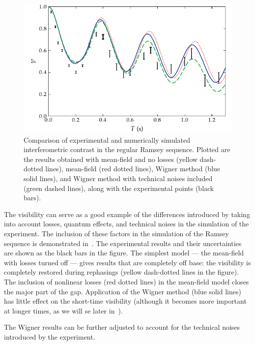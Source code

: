 \begin{figure}
    \centerline{\includegraphics{figures_generated/bec_noise/ramsey_visibility_short.pdf}}

    \caption{
    Comparison of experimental and numerically simulated interferometric contrast in the regular Ramsey sequence.
    Plotted are the results obtained with mean-field and no losses (yellow dash-dotted lines), mean-field (red dotted lines), Wigner method (blue solid lines), and Wigner method with technical noises included (green dashed lines), along with the experimental points (black bars).}

    \label{fig:bec-noise:visibility:ramsey-visibility}
\end{figure}

The visibility can serve as a good example of the differences introduced by taking into account losses, quantum effects, and technical noises in the simulation of the experiment.
The inclusion of these factors in the simulation of the Ramsey sequence is demonstrated in~.
The experimental results and their uncertainties are shown as the black bars in the figure.
The simplest model --- the mean-field with losses turned off --- gives results that are completely off base: the visibility is completely restored during rephasings (yellow dash-dotted lines in the figure).
The inclusion of nonlinear losses (red dotted lines) in the mean-field model closes the major part of the gap.
Application of the Wigner method (blue solid lines) has little effect on the short-time visibility (although it becomes more important at longer times, as we will se later in~).

The Wigner results can be further adjusted to account for the technical noises introduced by the experiment.

